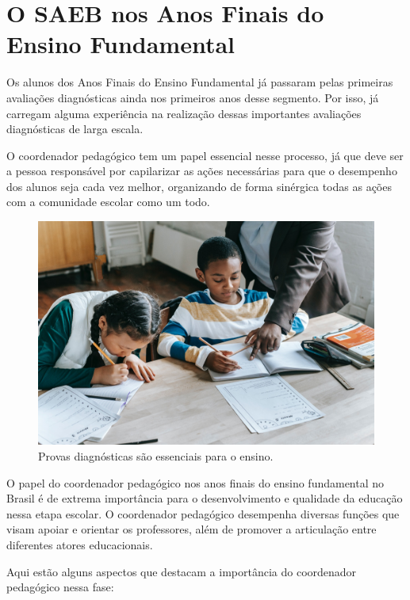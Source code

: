 \captionsetup{justification=raggedright, singlelinecheck=false}

\section{O SAEB nos Anos Finais do Ensino
Fundamental}

Os alunos dos Anos Finais do Ensino Fundamental já passaram pelas primeiras
avaliações diagnósticas ainda nos primeiros anos desse segmento. Por
isso, já carregam alguma experiência na realização dessas importantes avaliações diagnósticas de larga escala. 

O coordenador pedagógico tem um papel essencial nesse processo, já que
deve ser a pessoa responsável por capilarizar as ações necessárias para que o desempenho dos alunos seja cada vez melhor, organizando de forma sinérgica todas as ações com a comunidade escolar como um todo.

\begin{figure}[t]
\centering
\includegraphics[width=\textwidth]{./imgs/Imagem001.jpg}
\caption{Provas diagnósticas são essenciais para o ensino.}
\end{figure}

O papel do coordenador pedagógico nos anos finais do ensino fundamental no Brasil é de extrema importância para o desenvolvimento e qualidade da educação nessa etapa escolar. O coordenador pedagógico desempenha diversas funções que visam apoiar e orientar os professores, além de promover a articulação entre diferentes atores educacionais.

Aqui estão alguns aspectos que destacam a importância do coordenador pedagógico nessa fase:

